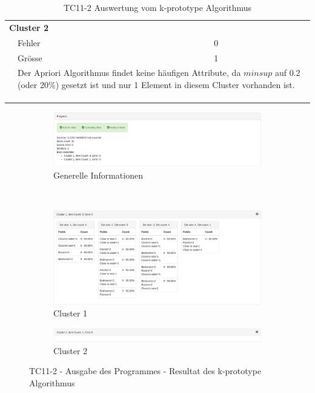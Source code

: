 \begin{longtable}{ | l | l | l | l |}
	\multicolumn{4}{|l|}{\textbf{Cluster 2}} \\ \cline{2-4} 
	& Fehler & \multicolumn{2}{|l|}{0} \\ \cline{2-4} 
	& Grösse & \multicolumn{2}{|l|}{1} \\ \cline{2-4} 
	& \multicolumn{3}{|L{7.5cm}|}{Der Apriori Algorithmus findet keine häufigen Attribute, da $minsup$ auf 0.2 (oder 20\%) gesetzt ist und nur 1 Element in diesem Cluster vorhanden ist.} \\ \hline
	
	\rowcolor{tableheadcolor}
	\multicolumn{4}{|l|}{\bfseries Testergebnis} \\ \hline 
	\multicolumn{4}{|l|}{\cellcolor{green!25}} \\ \hline 
	
	\caption{TC11-2 Auswertung vom k-prototype Algorithmus}
	\centering
	\label{fig:testingfazit:testing:testcases:11:2}
\end{longtable}
\begin{figure}[H]
	\begin{subfigure}[t]{1\textwidth}
		\centering
		\includegraphics[width=1\textwidth]{images/tc11-kprototype-1}
		\caption{Generelle Informationen}
		\label{fig:testingfazit:testing:testcases:11-2-1}
	\end{subfigure} \\
	\begin{subfigure}[t]{1\textwidth}
		\centering
		\includegraphics[width=1\textwidth]{images/tc11-kprototype-2}
		\caption{Cluster 1}
		\label{fig:testingfazit:testing:testcases:11-2-2}
	\end{subfigure}
	\begin{subfigure}[t]{1\textwidth}
		\centering
		\includegraphics[width=1\textwidth]{images/tc11-kprototype-3}
		\caption{Cluster 2}
		\label{fig:testingfazit:testing:testcases:11-2-3}
	\end{subfigure}
	\caption{TC11-2 - Ausgabe des Programmes - Resultat des k-prototype Algorithmus}
	\label{fig:testingfazit:testing:testcases:11-2}
\end{figure}

